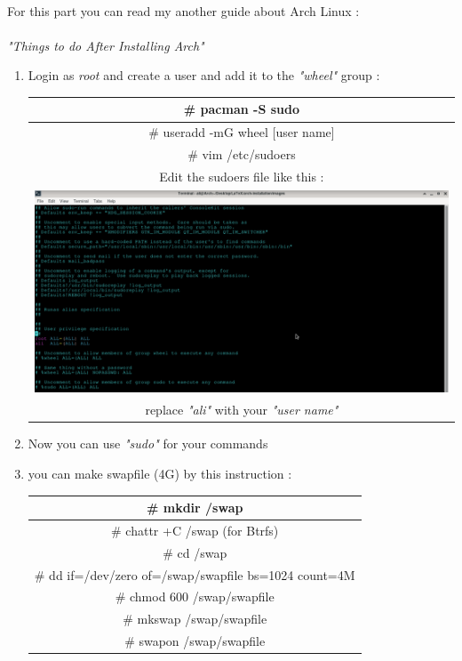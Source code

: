 \documentclass[12pt, a4paper]{article}
\begin{document}
\paragraph{}
For this part you can read my another guide about Arch Linux :

\begin{Large}
	\paragraph{}
	\centering
	\emph{"Things to do After Installing Arch"}
\end{Large}

\begin{enumerate}
	\item Login as \emph{root} and create a user  and add it to the \emph{"wheel"} group :
	
	\begin{center}
		\begin{tabular}{|c|} \hline
			\# pacman -S sudo\\ \hline
			\# useradd -mG wheel [user name]\\ \hline
			\# vim  /etc/sudoers\\ \hline
			Edit the sudoers file like this :\\
			\includegraphics[scale=0.3]{sudoers.png}\\
			replace \emph{"ali"} with your \emph{"user name"}\\ \hline
		\end{tabular}
	\end{center}
	
	\item Now you can use \emph{"sudo"} for your commands 
	\item you can make swapfile (4G) by this instruction :
	
		\begin{center}
		\begin{tabular}{|c|} \hline
			\# mkdir /swap\\ \hline
			\# chattr +C /swap (for Btrfs)\\ \hline
			\# cd /swap\\ \hline
			\# dd if=/dev/zero of=/swap/swapfile bs=1024 count=4M\\ \hline
			\# chmod 600 /swap/swapfile\\ \hline
			\# mkswap /swap/swapfile\\ \hline
			\# swapon /swap/swapfile\\ \hline
		\end{tabular}
	\end{center}
	

\end{enumerate}
\end{document}
